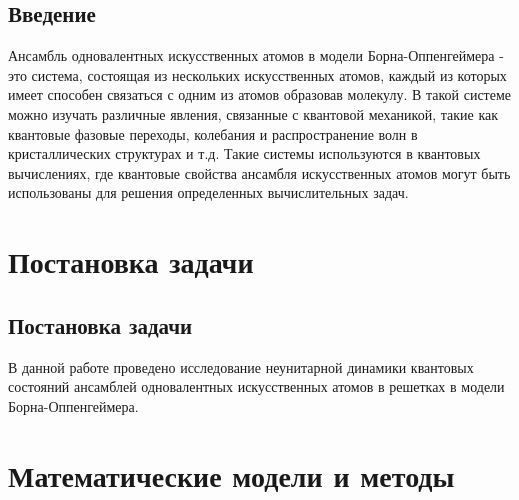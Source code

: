 \documentclass[12pt, a4paper]{article}
\begin{document}
\subsection{Введение}
\qquad Ансамбль одновалентных искусственных атомов в модели Борна-Оппенгеймера - это система, состоящая из нескольких искусственных атомов, каждый из которых имеет способен связаться с одним из атомов образовав молекулу.
\newline \null 
\qquad В такой системе можно изучать различные явления, связанные с квантовой механикой, такие как квантовые фазовые переходы, колебания и распространение волн в кристаллических структурах и т.д. 
Такие системы используются в квантовых вычислениях, где квантовые свойства ансамбля искусственных атомов могут быть использованы для решения определенных вычислительных задач.
\section{Постановка задачи}
\subsection{Постановка задачи}
\qquad В данной работе проведено исследование неунитарной динамики квантовых состояний ансамблей одновалентных искусственных атомов в решетках в модели Борна-Оппенгеймера.
\section{Математические модели и методы}
\end{document}
